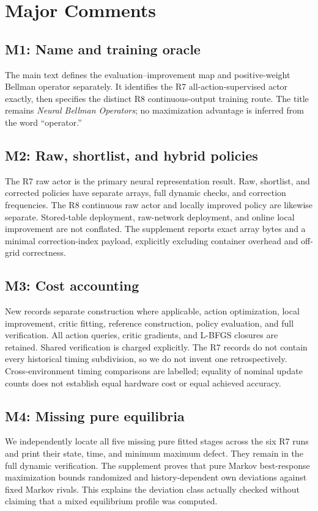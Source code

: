 \section{Major Comments}
\subsection{M1: Name and training oracle}
The main text defines the evaluation--improvement map and positive-weight Bellman operator separately. It identifies the R7 all-action-supervised actor exactly, then specifies the distinct R8 continuous-output training route. The title remains \emph{Neural Bellman Operators}; no maximization advantage is inferred from the word ``operator.''

\subsection{M2: Raw, shortlist, and hybrid policies}
The R7 raw actor is the primary neural representation result. Raw, shortlist, and corrected policies have separate arrays, full dynamic checks, and correction frequencies. The R8 continuous raw actor and locally improved policy are likewise separate. Stored-table deployment, raw-network deployment, and online local improvement are not conflated. The supplement reports exact array bytes and a minimal correction-index payload, explicitly excluding container overhead and off-grid correctness.

\subsection{M3: Cost accounting}
New records separate construction where applicable, action optimization, local improvement, critic fitting, reference construction, policy evaluation, and full verification. All action queries, critic gradients, and L-BFGS closures are retained. Shared verification is charged explicitly. The R7 records do not contain every historical timing subdivision, so we do not invent one retrospectively. Cross-environment timing comparisons are labelled; equality of nominal update counts does not establish equal hardware cost or equal achieved accuracy.

\subsection{M4: Missing pure equilibria}
We independently locate all five missing pure fitted stages across the six R7 runs and print their state, time, and minimum maximum defect. They remain in the full dynamic verification. The supplement proves that pure Markov best-response maximization bounds randomized and history-dependent own deviations against fixed Markov rivals. This explains the deviation class actually checked without claiming that a mixed equilibrium profile was computed.

